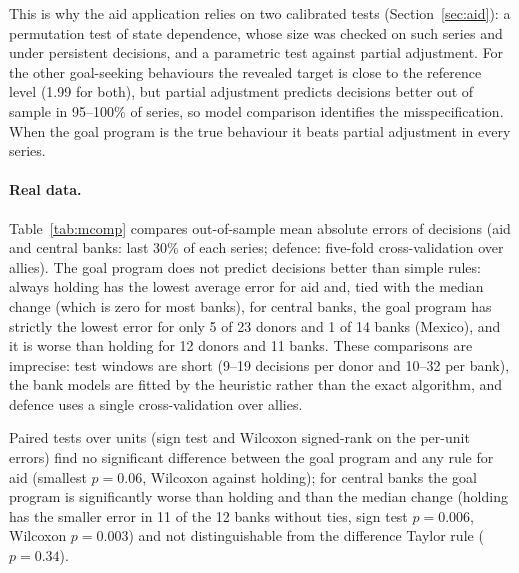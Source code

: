 \documentclass[11pt,a4paper]{article}
\theoremstyle{remark}\newtheorem{remark}{Remark}
\begin{document}
This is why the aid application relies on two calibrated tests (Section~\ref{sec:aid}): a permutation test of state dependence, whose size was checked on such series and under persistent decisions, and a parametric test against partial adjustment. For the other goal-seeking behaviours the revealed target is close to the reference level (1.99 for both), but partial adjustment predicts decisions better out of sample in 95--100\% of series, so model comparison identifies the misspecification. When the goal program is the true behaviour it beats partial adjustment in every series.
\begin{table}[t]\centering\small
\caption{Placebo and misspecification experiments (100 replications each; PA: linear partial adjustment fitted by least absolute deviations; out-of-sample comparisons on the last 30\% of each series).}\label{tab:placebo}\end{table}

\paragraph{Real data.} Table~\ref{tab:mcomp} compares out-of-sample mean absolute errors of decisions (aid and central banks: last 30\% of each series; defence: five-fold cross-validation over allies). The goal program does not predict decisions better than simple rules: always holding has the lowest average error for aid and, tied with the median change (which is zero for most banks), for central banks, the goal program has strictly the lowest error for only 5 of 23 donors and 1 of 14 banks (Mexico), and it is worse than holding for 12 donors and 11 banks. These comparisons are imprecise: test windows are short (9--19 decisions per donor and 10--32 per bank), the bank models are fitted by the heuristic rather than the exact algorithm, and defence uses a single cross-validation over allies.

Paired tests over units (sign test and Wilcoxon signed-rank on the per-unit errors) find no significant difference between the goal program and any rule for aid (smallest $p=0.06$, Wilcoxon against holding); for central banks the goal program is significantly worse than holding and than the median change (holding has the smaller error in 11 of the 12 banks without ties, sign test $p=0.006$, Wilcoxon $p=0.003$) and not distinguishable from the difference Taylor rule ($p=0.34$).
\end{document}
